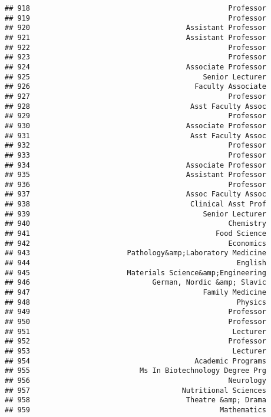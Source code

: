\documentclass[
]{article}
\begin{document}
\begin{verbatim}
## 918                                               Professor
## 919                                               Professor
## 920                                     Assistant Professor
## 921                                     Assistant Professor
## 922                                               Professor
## 923                                               Professor
## 924                                     Associate Professor
## 925                                         Senior Lecturer
## 926                                       Faculty Associate
## 927                                               Professor
## 928                                      Asst Faculty Assoc
## 929                                               Professor
## 930                                     Associate Professor
## 931                                      Asst Faculty Assoc
## 932                                               Professor
## 933                                               Professor
## 934                                     Associate Professor
## 935                                     Assistant Professor
## 936                                               Professor
## 937                                     Assoc Faculty Assoc
## 938                                      Clinical Asst Prof
## 939                                         Senior Lecturer
## 940                                               Chemistry
## 941                                            Food Science
## 942                                               Economics
## 943                       Pathology&amp;Laboratory Medicine
## 944                                                 English
## 945                       Materials Science&amp;Engineering
## 946                             German, Nordic &amp; Slavic
## 947                                         Family Medicine
## 948                                                 Physics
## 949                                               Professor
## 950                                               Professor
## 951                                                Lecturer
## 952                                               Professor
## 953                                                Lecturer
## 954                                       Academic Programs
## 955                          Ms In Biotechnology Degree Prg
## 956                                               Neurology
## 957                                    Nutritional Sciences
## 958                                     Theatre &amp; Drama
## 959                                             Mathematics

\end{verbatim}
\end{document}
